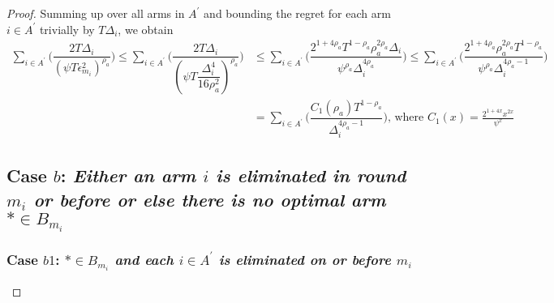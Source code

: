 \begin{proof}
Summing up over all arms in $A^{'}$ and bounding the regret for each arm $i\in A^{'}$ trivially by $T\Delta_{i}$, we obtain
   \begin{align*}
\sum_{i\in A^{'}}\bigg(\dfrac{2T\Delta_{i}}{(\psi T\epsilon_{m_{i}}^{2})^{\rho_{a}}}\bigg)
\leq\sum_{i\in A^{'}}\bigg(\dfrac{2T\Delta_{i}}{(\psi T\dfrac{\Delta_{i}^{4}}{16\rho_{a}^{2}})^{\rho_{a}}}\bigg)
&\leq \sum_{i\in A^{'}}\bigg(\dfrac{2^{1+4\rho_{a}}T^{1-\rho_{a}}\rho_{a}^{2\rho_{a}}\Delta_{i}}{\psi^{\rho_{a}}\Delta_{i}^{4\rho_{a}}}\bigg)
\leq \sum_{i\in A^{'}}\bigg(\dfrac{2^{1+4\rho_{a}}\rho_{a}^{2\rho_{a}}T^{1-\rho_{a}}}{\psi^{\rho_{a}}\Delta_{i}^{4\rho_{a}-1}}\bigg)\\   
& =\sum_{i\in A^{'}}\bigg(\dfrac{C_{1}(\rho_{a})T^{1-\rho_{a}}}{\Delta_{i}^{4\rho_{a}-1}}\bigg) \text{, where } C_1(x) = \frac{2^{1+4x}x^{2x}}{\psi^{x}}
   \end{align*}


% 



\subsection*{Case $b$: \textit{Either an arm ${i}$ is eliminated in round $m_{i}$ or before or else there is no optimal arm ${*}\in B_{m_{i}}$ }}

\subsubsection*{Case $b1$: \textit{${*}\in B_{m_{i}}$ and each ${i}\in A^{'}$ is  eliminated on or before $m_{i}$ } }


\end{proof}
